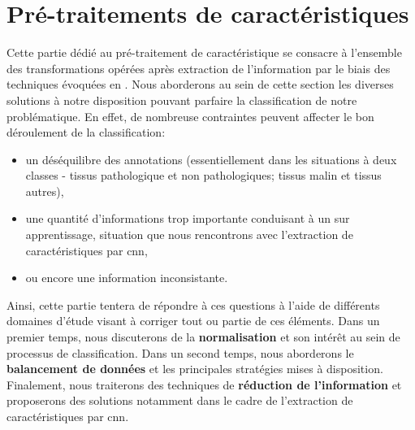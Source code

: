 \clearpage

\section{Pré-traitements de caractéristiques}
Cette partie dédié au pré-traitement de caractéristique se consacre à l'ensemble des transformations opérées après extraction de l'information par le biais des techniques évoquées en . Nous aborderons au sein de cette section les diverses solutions à notre disposition pouvant parfaire la classification de notre problématique. En effet, de nombreuse contraintes peuvent affecter le bon déroulement de la classification:
\begin{itemize}
    \item un déséquilibre des annotations (essentiellement dans les situations à deux classes -  tissus pathologique et non pathologiques; tissus malin et tissus autres),
    \item une quantité d'informations trop importante conduisant à un sur apprentissage, situation que nous rencontrons avec l'extraction de caractéristiques par \gls{cnn},
    \item ou encore une information inconsistante.
\end{itemize}\par

Ainsi, cette partie tentera de répondre à ces questions à l'aide de différents domaines d'étude visant à corriger tout ou partie de ces éléments. Dans un premier temps, nous discuterons de la \textbf{normalisation} et son intérêt au sein de processus de classification. Dans un second temps, nous aborderons le \textbf{balancement de données} et les principales stratégies mises à disposition. Finalement, nous traiterons des techniques de \textbf{réduction de l'information} et proposerons des solutions notamment dans le cadre de l'extraction de caractéristiques par \gls{cnn}.

